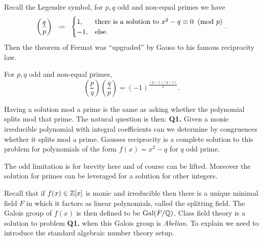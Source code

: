 Recall the Legendre symbol, for \(p, q\) odd and non-equal primes we have 
\[\left(\frac{q}{p}\right) \defeq \begin{cases}
	1 , & \text{there is a solution to }x^2 - q \equiv 0 \;\;(\text{mod }p)\\
	-1 , & \text{else.}
\end{cases}.\]
Then the theorem of Fermat was ``upgraded'' by Gauss to his famous reciprocity law.

\begin{Theorem}
	For \(p, q\) odd and non-equal primes,
	\[\left(\frac{p}{q}\right)\left(\frac{q}{p}\right) = (-1)^{\frac{(p-1)(q-1)}{2}}.\]
\end{Theorem}

Having a solution mod a prime is the same as asking whether the polynomial splits mod that prime. The natural question is then: \textbf{Q1.} Given a monic irreducible polynomial with integral coefficients can we determine by congruences whether it splits mod a prime. Gausses reciprocity is a complete solution to this problem for polynomials of the form \(f(x) = x^2 - q\) for \(q\) odd prime. 
\begin{remark}
	The odd limitation is for brevity here and of course can be lifted. Moreover the solution for primes can be leveraged for a solution for other integers. 
\end{remark}
Recall that if \(f(x)\in \Z[x]\) is monic and irreducible then there is a unique minimal field \(F\) in which it factors as linear polynomials, called the splitting field. The Galois group of \(f(x)\) is then defined to be \(\mathrm{Gal}(F/\Q)\). Class field theory is a solution to problem \textbf{Q1.} when this Galois group is \textit{Abelian}. To explain we need to introduce the standard algebraic number theory setup.

